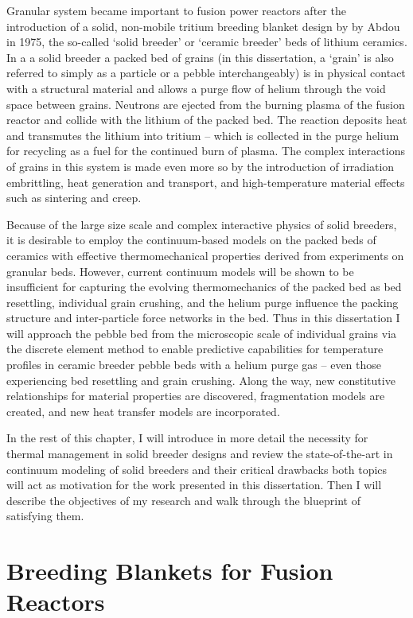 Granular system became important to fusion power reactors after the introduction of a solid, non-mobile tritium breeding blanket design by by Abdou\etal\cite{Abdou1975} in 1975, the so-called `solid breeder' or `ceramic breeder' beds of lithium ceramics. In a a solid breeder a packed bed of grains (in this dissertation, a `grain' is also referred to simply as a particle or a pebble interchangeably) is in physical contact with a structural material and allows a purge flow of helium through the void space between grains. Neutrons are ejected from the burning plasma of the fusion reactor and collide with the lithium of the packed bed. The reaction deposits heat and transmutes the lithium into tritium -- which is collected in the purge helium for recycling as a fuel for the continued burn of plasma. The complex interactions of grains in this system is made even more so by the introduction of irradiation embrittling, heat generation and transport, and high-temperature material effects such as sintering and creep.

Because of the large size scale and complex interactive physics of solid breeders, it is desirable to employ the continuum-based models on the packed beds of ceramics with effective thermomechanical properties derived from experiments on granular beds. However, current continuum models will be shown to be insufficient for capturing the evolving thermomechanics of the packed bed as bed resettling, individual grain crushing, and the helium purge influence the packing structure and inter-particle force networks in the bed. Thus in this dissertation I will approach the pebble bed from the microscopic scale of individual grains via the discrete element method to enable predictive capabilities for temperature profiles in ceramic breeder pebble beds with a helium purge gas -- even those experiencing bed resettling and grain crushing. Along the way, new constitutive relationships for material properties are discovered, fragmentation models are created, and new heat transfer models are incorporated.

In the rest of this chapter, I will introduce in more detail the necessity for thermal management in solid breeder designs and review the state-of-the-art in continuum modeling of solid breeders and their critical drawbacks both topics will act as motivation for the work presented in this dissertation. Then I will describe the objectives of my research and walk through the blueprint of satisfying them.


\section{Breeding Blankets for Fusion Reactors}

